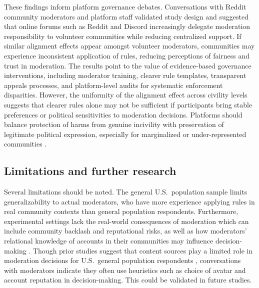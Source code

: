 \documentclass[12pt]{article}
\begin{document}
These findings inform platform governance debates. Conversations with Reddit community moderators and platform staff validated study design and suggested that online forums such as Reddit and Discord increasingly delegate moderation responsibility to volunteer communities while reducing centralized support. If similar alignment effects appear amongst volunteer moderators, communities may experience inconsistent application of rules, reducing perceptions of fairness and trust in moderation. The results point to the value of evidence-based governance interventions, including moderator training, clearer rule templates, transparent appeals processes, and platform-level audits for systematic enforcement disparities. However, the uniformity of the alignment effect across civility levels suggests that clearer rules alone may not be sufficient if participants bring stable preferences or political sensitivities to moderation decisions. Platforms should balance protection of harms from genuine incivility with preservation of legitimate political expression, especially for marginalized or under-represented communities \parencite{leesNewGenerationPerspective2022,kozyrevaResolvingContentModeration2023}.

\subsection{Limitations and further research}

Several limitations should be noted. The general U.S.\ population sample limits generalizability to actual moderators, who have more experience applying rules in real community contexts than general population respondents. Furthermore, experimental settings lack the real-world consequences of moderation which can include community backlash and reputational risks, as well as how moderators' relational knowledge of accounts in their communities may influence decision-making \parencite{taylorIdentityEffectsSocial2023}. Though prior studies suggest that content sources play a limited role in moderation decisions for U.S.\ general population respondents \parencite{kozyrevaResolvingContentModeration2023,solomonIllusoryInterpartyDisagreement2024}, conversations with moderators indicate they often use heuristics such as choice of avatar and account reputation in decision-making. This could be validated in future studies.
\end{document}
